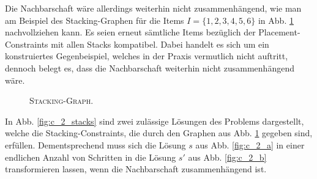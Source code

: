 Die Nachbarschaft wäre allerdings weiterhin nicht zusammenhängend, wie man am Beispiel des Stacking-Graphen
für die Items $I = \{1, 2, 3, 4, 5, 6\}$ in Abb. \ref{fig:counter_2_stacking_graph} nachvollziehen kann.
Es seien erneut sämtliche Items bezüglich der Placement-Constraints mit allen Stacks kompatibel.
Dabei handelt es sich um ein konstruiertes Gegenbeispiel, welches in der Praxis vermutlich nicht auftritt,
dennoch belegt es, dass die Nachbarschaft weiterhin nicht zusammenhängend wäre.
\begin{figure}[H]
  \centering
  \caption{\textsc{Stacking-Graph}.}
  \label{fig:counter_2_stacking_graph}
\end{figure}

In Abb. \ref{fig:c_2_stacks} sind zwei zulässige Lösungen des Problems dargestellt, welche die Stacking-Constraints, die durch den
Graphen aus Abb. \ref{fig:counter_2_stacking_graph} gegeben sind, erfüllen. Dementsprechend muss sich die Lösung $s$
aus Abb. \ref{fig:c_2_a} in einer endlichen Anzahl von Schritten in die Lösung $s'$ aus Abb. \ref{fig:c_2_b} transformieren lassen,
wenn die Nachbarschaft zusammenhängend ist.

